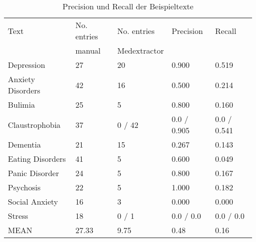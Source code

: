 \begin{table}
\begin{center}
\begin{tabular}{lllll}
\toprule
            Text & No. entries        & No. entries              & Precision & Recall \\
                 & manual             &  Medextractor            &           &        \\
\midrule
      Depression &                 27 &                       20 &     0.900 &  0.519 \\
Anxiety Disorders &                 42 &                       16 &     0.500 &  0.214 \\
         Bulimia &                 25 &                        5 &     0.800 &  0.160 \\
  Claustrophobia &                 37 &                   0 / 42 & 0.0 / 0.905 & 0.0 / 0.541 \\
        Dementia &                 21 &                       15 &     0.267 &  0.143 \\
 Eating Disorders &                 41 &                        5 &     0.600 &  0.049 \\
   Panic Disorder &                 24 &                        5 &     0.800 &  0.167 \\
       Psychosis &                 22 &                        5 &     1.000 &  0.182 \\
   Social Anxiety &                 16 &                        3 &     0.000 &  0.000 \\
          Stress &                 18 &                    0 / 1 & 0.0 / 0.0 & 0.0 / 0.0 \\
\midrule
       MEAN &                27.33 &     9.75 & 0.48 & 0.16 \\
\bottomrule
\end{tabular}
\caption{Precision und Recall der Beispieltexte}
\label{tab:precision_recall}
\end{center}
\end{table}




